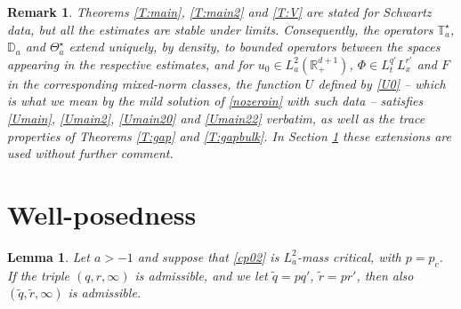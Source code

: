 \documentclass[10pt,a4paper]{amsart}
\newtheorem{remark}{Remark}
\newtheorem{lemma}{Lemma}
\def \RN {\mathbb{R}_+^{d+1}}
\begin{document}
\begin{remark}\label{R:density}
Theorems \ref{T:main}, \ref{T:main2} and \ref{T:V} are stated for Schwartz data, but all the estimates are stable under limits. Consequently, the operators $\mathbb T^\star_a$, $\mathbb D_a$ and $\Theta^\star_a$ extend uniquely, by density, to bounded operators between the spaces appearing in the respective estimates, and for $u_0\in L^2_a(\RN)$, $\Phi\in L^{q'}_tL^{r'}_x$ and $F$ in the corresponding mixed-norm classes, the function $U$ defined by \eqref{U0} -- which is what we mean by the \emph{mild solution} of \eqref{nozeroin} with such data -- satisfies \eqref{Umain}, \eqref{Umain2}, \eqref{Umain20} and \eqref{Umain22} verbatim, as well as the trace properties of Theorems \ref{T:gap} and \ref{T:gapbulk}. In Section \ref{S:well} these extensions are used without further comment.
\end{remark}

\section{Well-posedness}\label{S:well}

\begin{lemma}\label{L:mass}
Let $a>-1$ and suppose that \eqref{cp02} is $L^2_a$-mass critical, with $p = p_c$. If the triple $(q,r,\infty)$ is admissible, and we let $\tilde q = p q'$, $\tilde r = p r'$, then also $(\tilde q,\tilde r,\infty)$ is admissible. 
\end{lemma}
\end{document}
